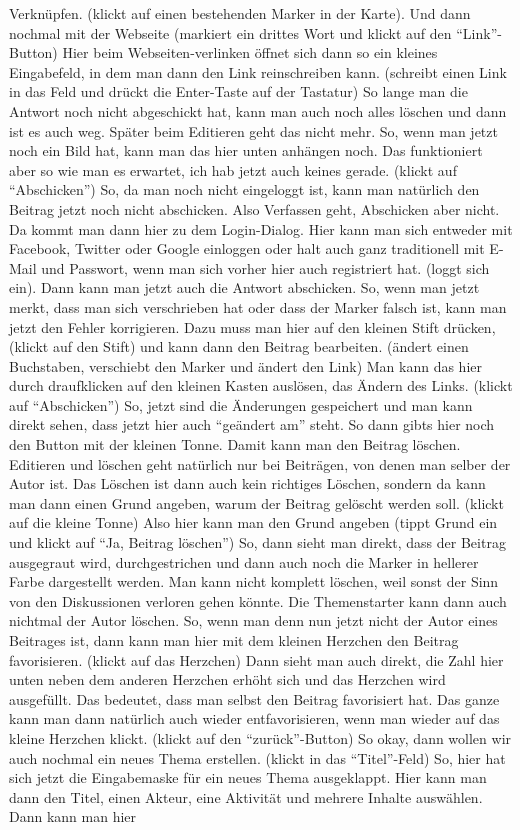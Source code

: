 \begin{itemize}
Verkn{\"u}pfen. (klickt auf einen bestehenden Marker in der Karte). Und dann nochmal mit der Webseite (markiert ein drittes Wort und klickt auf den "`Link"'-Button) Hier beim Webseiten-verlinken {\"o}ffnet sich dann so ein kleines Eingabefeld, in dem man dann den Link reinschreiben kann. (schreibt einen Link in das Feld und dr{\"u}ckt die Enter-Taste auf der Tastatur) So lange man die Antwort noch nicht abgeschickt hat, kann man auch noch alles l{\"o}schen und dann ist es auch weg. Sp{\"a}ter beim Editieren geht das nicht mehr. So, wenn man jetzt noch ein Bild hat, kann man das hier unten anh{\"a}ngen noch. Das funktioniert aber so wie man es erwartet, ich hab jetzt auch keines gerade. (klickt auf "`Abschicken"') So, da man noch nicht eingeloggt ist, kann man nat{\"u}rlich den Beitrag jetzt noch nicht abschicken. Also Verfassen geht, Abschicken aber nicht. Da kommt man dann hier zu dem Login-Dialog. Hier kann man sich entweder mit Facebook, Twitter oder Google einloggen oder halt auch ganz traditionell mit E-Mail und Passwort, wenn man sich vorher hier auch registriert hat. (loggt sich ein). Dann kann man jetzt auch die Antwort abschicken. So, wenn man jetzt merkt, dass man sich verschrieben hat oder dass der Marker falsch ist, kann man jetzt den Fehler korrigieren. Dazu muss man hier auf den kleinen Stift dr{\"u}cken, (klickt auf den Stift) und kann dann den Beitrag bearbeiten. ({\"a}ndert einen Buchstaben, verschiebt den Marker und {\"a}ndert den Link) Man kann das hier durch draufklicken auf den kleinen Kasten ausl{\"o}sen, das {\"A}ndern des Links. (klickt auf "`Abschicken"') So, jetzt sind die {\"A}nderungen gespeichert und man kann direkt sehen, dass jetzt hier auch "`ge{\"a}ndert am"' steht. So dann gibts hier noch den Button mit der kleinen Tonne. Damit kann man den Beitrag l{\"o}schen. Editieren und l{\"o}schen geht nat{\"u}rlich nur bei Beitr{\"a}gen, von denen man selber der Autor ist. Das L{\"o}schen ist dann auch kein richtiges L{\"o}schen, sondern da kann man dann einen Grund angeben, warum der Beitrag gel{\"o}scht werden soll. (klickt auf die kleine Tonne) Also hier kann man den Grund angeben (tippt Grund ein und klickt auf "`Ja, Beitrag l{\"o}schen"') So, dann sieht man direkt, dass der Beitrag ausgegraut wird, durchgestrichen und dann auch noch die Marker in hellerer Farbe dargestellt werden. Man kann nicht komplett l{\"o}schen, weil sonst der Sinn von den Diskussionen verloren gehen k{\"o}nnte. Die Themenstarter kann dann auch nichtmal der Autor l{\"o}schen. So, wenn man denn nun jetzt nicht der Autor eines Beitrages ist, dann kann man hier mit dem kleinen Herzchen den Beitrag favorisieren. (klickt auf das Herzchen) Dann sieht man auch direkt, die Zahl hier unten neben dem anderen Herzchen erh{\"o}ht sich und das Herzchen wird ausgef{\"u}llt. Das bedeutet, dass man selbst den Beitrag favorisiert hat. Das ganze kann man dann nat{\"u}rlich auch wieder entfavorisieren, wenn man wieder auf das kleine Herzchen klickt. (klickt auf den "`zur{\"u}ck"'-Button) So okay, dann wollen wir auch nochmal ein neues Thema erstellen. (klickt in das "`Titel"'-Feld) So, hier hat sich jetzt die Eingabemaske f{\"u}r ein neues Thema ausgeklappt. Hier kann man dann den Titel, einen Akteur, eine Aktivit{\"a}t und mehrere Inhalte ausw{\"a}hlen. Dann kann man hier 
\end{itemize}
